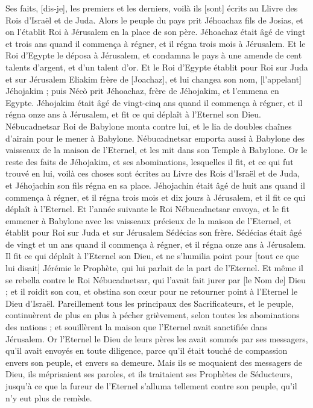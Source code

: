 \begin{multicols}{2}
Ses faits, [dis-je], les premiers et les derniers, voilà ils [sont] écrits au Llivre des Rois d'Israël et de Juda.
\VerseOne{}Alors le peuple du pays prit Jéhoachaz fils de Josias, et on l'établit Roi à Jérusalem en la place de son père.
Jéhoachaz était âgé de vingt et trois ans quand il commença à régner, et il régna trois mois à Jérusalem.
Et le Roi d'Egypte le déposa à Jérusalem, et condamna le pays à une amende de cent talents d'argent, et d'un talent d'or.
Et le Roi d'Egypte établit pour Roi sur Juda et sur Jérusalem Eliakim frère de [Joachaz], et lui changea son nom, [l'appelant] Jéhojakim ; puis Nécò prit Jéhoachaz, frère de Jéhojakim, et l'emmena en Egypte.
Jéhojakim était âgé de vingt-cinq ans quand il commença à régner, et il régna onze ans à Jérusalem, et fit ce qui déplaît à l'Eternel son Dieu.
Nébucadnetsar Roi de Babylone monta contre lui, et le lia de doubles chaînes d'airain pour le mener à Babylone.
Nébucadnetsar emporta aussi à Babylone des vaisseaux de la maison de l'Eternel, et les mit dans son Temple à Babylone.
Or le reste des faits de Jéhojakim, et ses abominations, lesquelles il fit, et ce qui fut trouvé en lui, voilà ces choses sont écrites au Livre des Rois d'Israël et de Juda, et Jéhojachin son fils régna en sa place.
Jéhojachin était âgé de huit ans quand il commença à régner, et il régna trois mois et dix jours à Jérusalem, et il fit ce qui déplaît à l'Eternel.
Et l'année suivante le Roi Nébucadnetsar envoya, et le fit emmener à Babylone avec les vaisseaux précieux de la maison de l'Eternel, et établit pour Roi sur Juda et sur Jérusalem Sédécias son frère.
Sédécias était âgé de vingt et un ans quand il commença à régner, et il régna onze ans à Jérusalem.
Il fit ce qui déplaît à l'Eternel son Dieu, et ne s'humilia point pour [tout ce que lui disait] Jérémie le Prophète, qui lui parlait de la part de l'Eternel.
Et même il se rebella contre le Roi Nébucadnetsar, qui l'avait fait jurer par [le Nom de] Dieu ; et il roidit son cou, et obstina son cœur pour ne retourner point à l'Eternel le Dieu d'Israël.
Pareillement tous les principaux des Sacrificateurs, et le peuple, continuèrent de plus en plus à pécher grièvement, selon toutes les abominations des nations ; et souillèrent la maison que l'Eternel avait sanctifiée dans Jérusalem.
Or l'Eternel le Dieu de leurs pères les avait sommés par ses messagers, qu'il avait envoyés en toute diligence, parce qu'il était touché de compassion envers son peuple, et envers sa demeure.
Mais ils se moquaient des messagers de Dieu, ils méprisaient ses paroles, et ils traitaient ses Prophètes de Séducteurs, jusqu'à ce que la fureur de l'Eternel s'alluma tellement contre son peuple, qu'il n'y eut plus de remède.

\end{multicols}
